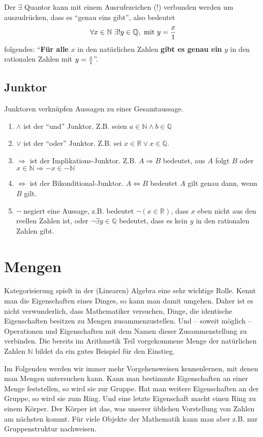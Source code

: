 Der $\exists$ Quantor kann mit einem Ausrufezeichen (!) verbunden werden um auszudrücken, dass es "`genau eins gibt"', also bedeutet
\[ \forall x\in \mathbb{N}\ \exists! y\in \mathbb{Q},\text{ mit }  y={x\over 1} \]
folgendes: "`\textbf{Für alle} $x$ in den natürlichen Zahlen \textbf{gibt es genau ein} $y$ in den rationalen Zahlen mit $y={x \over 1}$"'.

\subsection{Junktor}

Junktoren verknüpfen Aussagen zu einer Gesamtaussage.

\begin{enumerate}
\item $\wedge $ ist der "`und"' Junktor. Z.B. seien $a\in \mathbb{N} \wedge b\in \mathbb{Q} $
\item $\vee$ ist der "`oder"' Junktor. Z.B. sei $x\in \mathbb{R} \vee x\in \mathbb{Q}$.
\item $\Rightarrow$ ist der Implikations-Junktor. Z.B. $A\Rightarrow B$ bedeutet, aus $A$ folgt $B$ oder $x\in \mathbb{N} \Rightarrow -x \in -\mathbb{N}$
\item $\Leftrightarrow$ ist der Bikonditional-Junktor. $A\Leftrightarrow B$ bedeutet $A$ gilt genau dann, wenn $B$ gilt.
\item $\neg$ negiert eine Aussage, z.B. bedeutet $\neg(x\in \mathbb{R})$, dass $x$ eben nicht aus den reellen Zahlen ist, oder $\neg \exists y\in \mathbb{Q}$ bedeutet, dass es kein $y$ in den rationalen Zahlen gibt.
\end{enumerate}


\section{Mengen}


Kategorisierung spielt in der (Linearen) Algebra eine sehr wichtige Rolle. Kennt man die Eigenschaften eines Dinges, so kann man damit umgehen. Daher ist es nicht verwunderlich, dass Mathematiker versuchen, Dinge, die identische Eigenschaften besitzen zu Mengen zusammenzustellen. Und -- soweit möglich -- Operationen und Eigenschaften mit dem Namen dieser Zusammenstellung zu verbinden. Die bereits im Arithmetik Teil vorgekommene Menge der natürlichen Zahlen $\mathbb{N}$ bildet da ein gutes Beispiel für den Einstieg. 

Im Folgenden werden wir immer mehr Vorgehensweisen kennenlernen, mit denen man Mengen untersuchen kann. Kann man bestimmte Eigenschaften an einer Menge feststellen, so wird sie zur Gruppe. Hat man weitere Eigenschaften an der Gruppe, so wird sie zum Ring. Und eine letzte Eigenschaft macht einen Ring zu einem Körper. Der Körper ist das, was unserer üblichen Vorstellung von Zahlen am nächsten kommt. Für viele Objekte der Mathematik kann man aber z.B. nur Gruppenstruktur nachweisen. 


